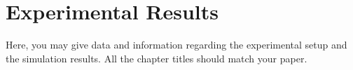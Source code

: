 \chapter{Experimental Results}
Here, you may give data and information regarding the experimental setup and the simulation results. All the chapter titles should match your paper.



